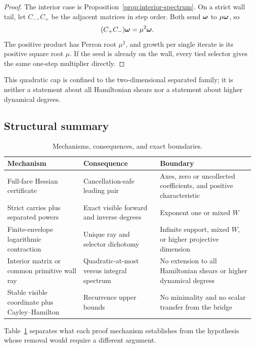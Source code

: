 \documentclass[11pt]{article}
\theoremstyle{definition}
\theoremstyle{remark}
\begin{document}
\begin{proof}
The interior case is Proposition~\ref{prop:interior-spectrum}.  On a
strict wall tail, let \(C_-,C_+\) be the adjacent matrices in step order.
Both send \(\boldsymbol{\omega}\) to \(\mu\boldsymbol{\omega}\), so
\[
(C_+C_-)\boldsymbol{\omega}=\mu^2\boldsymbol{\omega}.
\]
The positive product has Perron root \(\mu^2\), and growth per single
iterate is its positive square root \(\mu\).  If the seed is already on
the wall, every tied selector gives the same one-step multiplier directly.
\end{proof}

This quadratic cap is confined to the two-dimensional separated family;
it is neither a statement about all Hamiltonian shears nor a statement
about higher dynamical degrees.

\subsection{Structural summary}

\begin{table}[t]
\centering
\begin{tabular}{@{}p{}p{}p{}@{}}
\toprule
Mechanism & Consequence & Boundary\\
\midrule
Full-face Hessian certificate & Cancellation-safe leading pair & Axes, zero or uncollected coefficients, and positive characteristic\\
Strict carries plus separated powers & Exact visible forward and inverse degrees & Exponent one or mixed \(W\)\\
Finite-envelope logarithmic contraction & Unique ray and selector dichotomy & Infinite support, mixed \(W\), or higher projective dimension\\
Interior matrix or common primitive wall ray & Quadratic-at-most versus integral spectrum & No extension to all Hamiltonian shears or higher dynamical degrees\\
Stable visible coordinate plus Cayley--Hamilton & Recurrence upper bounds & No minimality and no scalar transfer from the bridge\\
\bottomrule
\end{tabular}
\caption{Mechanisms, consequences, and exact boundaries.}
\label{tab:mechanisms}
\end{table}

Table~\ref{tab:mechanisms} separates what each proof mechanism establishes
from the hypothesis whose removal would require a different argument.
\end{document}
